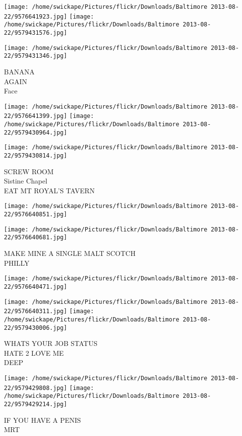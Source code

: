 \documentclass[10pt,letterpaper]{article}
\begin{document}
\texttt{[image: /home/swickape/Pictures/flickr/Downloads/Baltimore 2013-08-22/9576641923.jpg]}
\texttt{[image: /home/swickape/Pictures/flickr/Downloads/Baltimore 2013-08-22/9579431576.jpg]}

\vspace{0.25in}
\texttt{[image: /home/swickape/Pictures/flickr/Downloads/Baltimore 2013-08-22/9579431346.jpg]}

BANANA\\
AGAIN\\
Face
\pagebreak

\texttt{[image: /home/swickape/Pictures/flickr/Downloads/Baltimore 2013-08-22/9576641399.jpg]}
\texttt{[image: /home/swickape/Pictures/flickr/Downloads/Baltimore 2013-08-22/9579430964.jpg]}

\vspace{0.25in}
\texttt{[image: /home/swickape/Pictures/flickr/Downloads/Baltimore 2013-08-22/9579430814.jpg]}

SCREW ROOM\\
Sistine Chapel\\
EAT MT ROYAL'S TAVERN
\pagebreak

\texttt{[image: /home/swickape/Pictures/flickr/Downloads/Baltimore 2013-08-22/9576640851.jpg]}

\vspace{0.25in}
\texttt{[image: /home/swickape/Pictures/flickr/Downloads/Baltimore 2013-08-22/9576640681.jpg]}

MAKE MINE A SINGLE MALT SCOTCH\\
PHILLY
\pagebreak

\texttt{[image: /home/swickape/Pictures/flickr/Downloads/Baltimore 2013-08-22/9576640471.jpg]}

\vspace{0.25in}
\texttt{[image: /home/swickape/Pictures/flickr/Downloads/Baltimore 2013-08-22/9576640311.jpg]}
\texttt{[image: /home/swickape/Pictures/flickr/Downloads/Baltimore 2013-08-22/9579430006.jpg]}

WHATS YOUR JOB STATUS\\
HATE 2 LOVE ME\\
DEEP
\pagebreak

\texttt{[image: /home/swickape/Pictures/flickr/Downloads/Baltimore 2013-08-22/9579429808.jpg]}
\texttt{[image: /home/swickape/Pictures/flickr/Downloads/Baltimore 2013-08-22/9579429214.jpg]}

IF YOU HAVE A PENIS\\
MRT
\pagebreak
\end{document}
